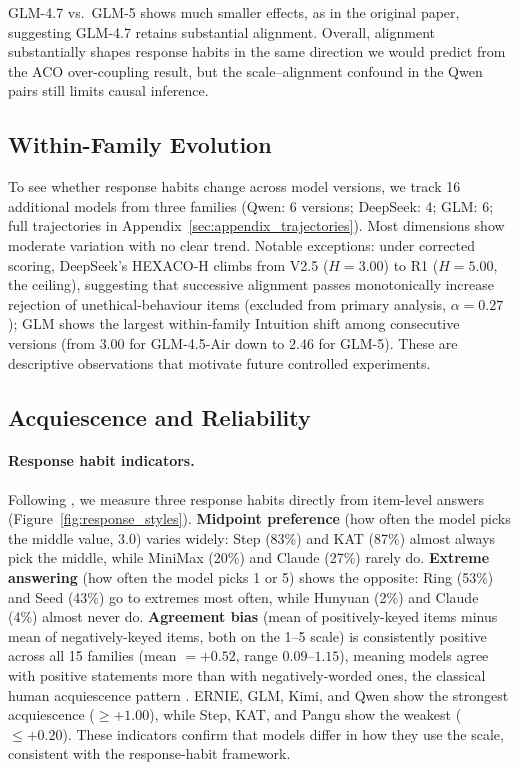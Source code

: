 \documentclass[11pt]{article}
\begin{document}
GLM-4.7 vs.\ GLM-5 shows much smaller effects, as in the original paper, suggesting GLM-4.7 retains substantial alignment.
Overall, alignment substantially shapes response habits in the same direction we would predict from the ACO over-coupling result, but the scale--alignment confound in the Qwen pairs still limits causal inference.


\subsection{Within-Family Evolution}
\label{sec:evolution}

To see whether response habits change across model versions, we track 16 additional models from three families (Qwen: 6 versions; DeepSeek: 4; GLM: 6; full trajectories in Appendix~\ref{sec:appendix_trajectories}).
Most dimensions show moderate variation with no clear trend.
Notable exceptions: under corrected scoring, DeepSeek's HEXACO-H climbs from V2.5 ($H = 3.00$) to R1 ($H = 5.00$, the ceiling), suggesting that successive alignment passes monotonically increase rejection of unethical-behaviour items (excluded from primary analysis, $\alpha = 0.27$); GLM shows the largest within-family Intuition shift among consecutive versions (from $3.00$ for GLM-4.5-Air down to $2.46$ for GLM-5).
These are descriptive observations that motivate future controlled experiments.

\subsection{Acquiescence and Reliability}
\label{sec:acquiescence}

\paragraph{Response habit indicators.}
Following \citet{paulhus1991response}, we measure three response habits directly from item-level answers (Figure~\ref{fig:response_styles}).
\textbf{Midpoint preference} (how often the model picks the middle value, 3.0) varies widely: Step (83\%) and KAT (87\%) almost always pick the middle, while MiniMax (20\%) and Claude (27\%) rarely do.
\textbf{Extreme answering} (how often the model picks 1 or 5) shows the opposite: Ring (53\%) and Seed (43\%) go to extremes most often, while Hunyuan (2\%) and Claude (4\%) almost never do.
\textbf{Agreement bias} (mean of positively-keyed items minus mean of negatively-keyed items, both on the 1--5 scale) is consistently positive across all 15 families (mean $= +0.52$, range $0.09$--$1.15$), meaning models agree with positive statements more than with negatively-worded ones, the classical human acquiescence pattern \citep{paulhus1991response}.
ERNIE, GLM, Kimi, and Qwen show the strongest acquiescence ($\geq +1.00$), while Step, KAT, and Pangu show the weakest ($\leq +0.20$).
These indicators confirm that models differ in how they use the scale, consistent with the response-habit framework.
\end{document}
